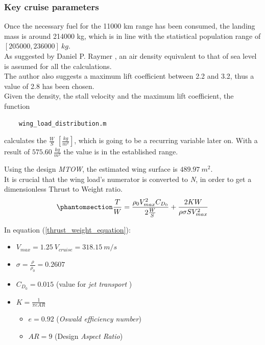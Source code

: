 \documentclass{article}
\begin{document}
 \subsubsection{Key cruise parameters\label{cruise_parameters}}

 Once the necessary fuel for the 11000 km range has been consumed, the landing mass is around 214000 kg,
 which is in line with the statistical population range of $[205000, 236000] \ kg$.\\ 
 As suggested by Daniel P. Raymer \autocite{Raymer_Daniel}, an air density equivalent
 to that of sea level is assumed for all the calculations. \\ 
 The author also suggests a maximum lift coefficient between 2.2 and 3.2, thus a value
 of 2.8 has been chosen.\\ 
 Given the density, the stall velocity and the maximum lift coefficient, the function \autocite{Airbus_replacement_repo}
 \begin{verbatim}
    wing_load_distribution.m
 \end{verbatim}
calculates the $\frac{W}{S}$  $[\frac{kg}{m^2}]$, which is going to be a recurring variable later on.
With a result of $575.60 \ \frac{kg}{m^2}$ the value is in the established range. 

Using the design \textit{MTOW}, the estimated wing surface is $489.97 \ m^2$. \\ 

It is crucial that the wing load's numerator is converted to \textit{N}, in order to get a dimensionless
Thrust to Weight ratio.\\ 
\begin{equation}
    \phantomsection
    \label{thrust_weight_equation}
    \frac{T}{W} = \frac{\rho_0 V^{2}_{max}C_{D_{0}}}{2\frac{W}{S}} + \frac{2KW}{\rho \sigma S V^{2}_{max}}
\end{equation}

In equation (\ref{thrust_weight_equation}):
\begin{itemize}
    \item $V_{max} = 1.25 \ V_{cruise} = 318.15 \ m/s$
    \item $\sigma = \frac{\rho}{\rho_0} = 0.2607$
    \item $C_{D_{0}} = 0.015$ (value for \textit{jet transport} \autocite{Sadraey_Mohammad})
    \item $K = \frac{1}{\pi e AR}$
        \begin{itemize}
            \item $e = 0.92$ (\textit{Oswald efficiency number})
            \item $AR = 9$ (Design \textit{Aspect Ratio})
        \end{itemize}
\end{itemize}
\end{document}
